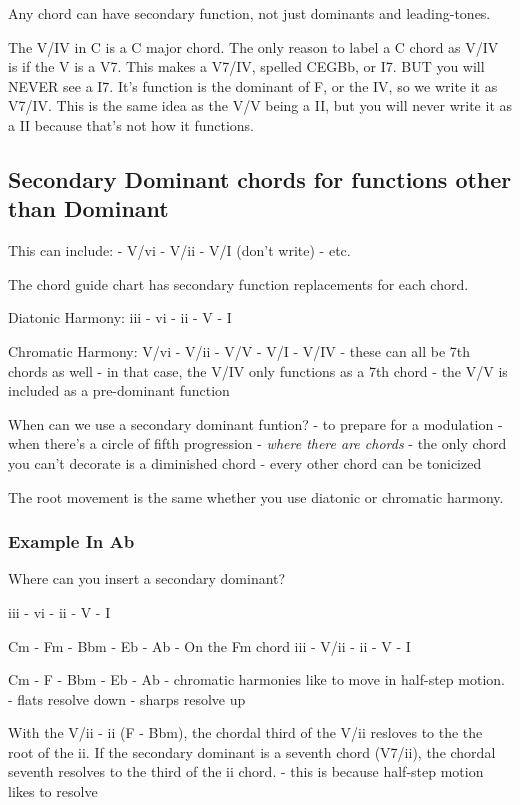 \documentclass{book}
\begin{document}
Any chord can have secondary function, not just dominants and leading-tones.

The V/IV in C is a C major chord. The only reason to label a C chord as V/IV
is if the V is a V7. This makes a V7/IV, spelled CEGBb, or I7. BUT you will
NEVER see a I7. It's function is the dominant of F, or the IV, so we write it
as V7/IV. This is the same idea as the V/V being a II, but you will never
write it as a II because that's not how it functions.

\hypertarget{secondary-dominant-chords-for-functions-other-than-dominant}{%
\subsection{Secondary Dominant chords for functions other than
Dominant}\label{secondary-dominant-chords-for-functions-other-than-dominant}}

This can include: - V/vi - V/ii - V/I (don't write) - etc.

The chord guide chart has secondary function replacements for each chord.

Diatonic Harmony: iii - vi - ii - V - I

Chromatic Harmony: V/vi - V/ii - V/V - V/I - V/IV - these can all be 7th
chords as well - in that case, the V/IV only functions as a 7th chord - the
V/V is included as a pre-dominant function

When can we use a secondary dominant funtion? - to prepare for a modulation -
when there's a circle of fifth progression - \emph{where there are chords} -
the only chord you can't decorate is a diminished chord - every other chord
can be tonicized

The root movement is the same whether you use diatonic or chromatic harmony.

\hypertarget{example-in-ab}{%
\subsubsection{Example In Ab}\label{example-in-ab}}

Where can you insert a secondary dominant?

iii - vi - ii - V - I

Cm - Fm - Bbm - Eb - Ab - On the Fm chord iii - V/ii - ii - V - I

Cm - F - Bbm - Eb - Ab - chromatic harmonies like to move in half-step motion.
- flats resolve down - sharps resolve up

With the V/ii - ii (F - Bbm), the chordal third of the V/ii resloves to the
the root of the ii. If the secondary dominant is a seventh chord (V7/ii), the
chordal seventh resolves to the third of the ii chord. - this is because
half-step motion likes to resolve
\end{document}
